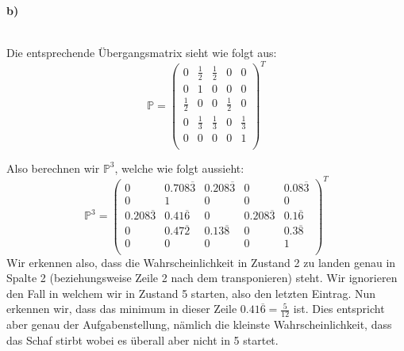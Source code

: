\documentclass[a4paper]{article}
\begin{document}
\textbf{b)} 
\begin{center}
\end{center}
\\

Die entsprechende Übergangsmatrix sieht wie folgt aus:
\[
\mathbb{P} = \begin{pmatrix} 
	0 & \frac{ 1 }{ 2 } & \frac{ 1 }{ 2 } & 0 & 0 \\
	0 & 1 & 0 & 0 & 0 \\
	\frac{ 1 }{ 2 } & 0 & 0 & \frac{ 1 }{ 2 } & 0 \\
	0 & \frac{ 1 }{ 3 } & \frac{ 1 }{ 3 } & 0 & \frac{ 1 }{ 3 } \\
	0 & 0 & 0 & 0 & 1 \\
\end{pmatrix} ^{T}
\] 

Also berechnen wir $\mathbb{P} ^{3}$, welche wie folgt aussieht:
\[
\mathbb{P} ^{3} = \begin{pmatrix} 
	0 & 0.708 \overline{3} & 0.208 \overline{3} & 0 & 0.08 \overline{3} \\
	0 & 1 & 0 & 0 & 0 \\
	0.208 \overline{3} & 0.41 \overline{6} & 0 & 0.208 \overline{3} & 0.1 \overline{6} \\
	0 & 0.47 \overline{2} & 0.13 \overline{8} & 0 & 0.3 \overline{8} \\
	0 & 0 & 0 & 0 & 1 \\
\end{pmatrix} ^{T}
\] 
Wir erkennen also, dass die Wahrscheinlichkeit in Zustand 2 zu landen genau in Spalte 2
(beziehungsweise Zeile 2 nach dem transponieren) steht. 
Wir ignorieren den Fall in welchem wir in Zustand 5 starten, also den letzten Eintrag.
Nun erkennen wir, dass das minimum in dieser Zeile $0.41 \overline{6} = \frac{ 5 }{ 12 }$ ist. Dies entspricht aber genau
der Aufgabenstellung, nämlich die kleinste Wahrscheinlichkeit, dass das Schaf stirbt wobei es überall
aber nicht in 5 startet.
\\
\end{document}
